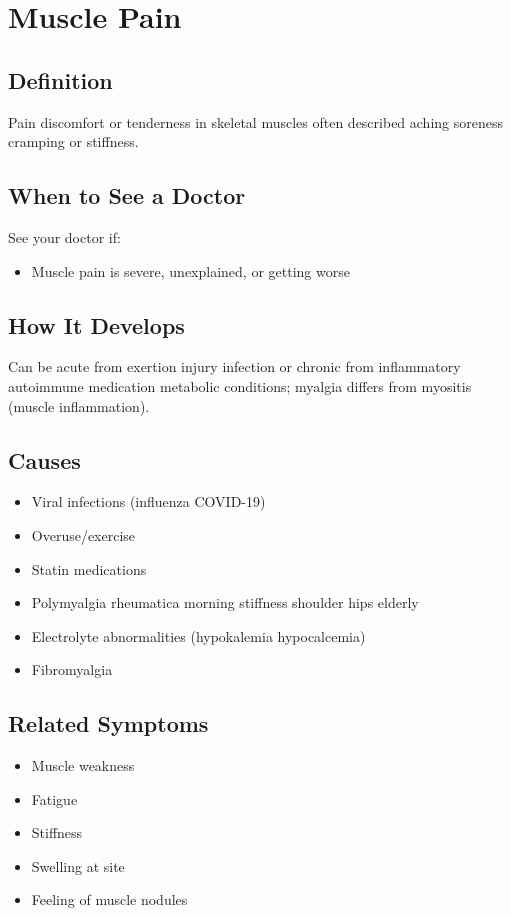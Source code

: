 \chapter{Muscle Pain}

\section*{Definition}
Pain discomfort or tenderness in skeletal muscles often described aching soreness cramping or stiffness.

\section*{When to See a Doctor}
See your doctor if:
\begin{itemize}
  \item Muscle pain is severe, unexplained, or getting worse
\end{itemize}

\section*{How It Develops}
Can be acute from exertion injury infection or chronic from inflammatory autoimmune medication metabolic conditions; myalgia differs from myositis (muscle inflammation).

\section*{Causes}
\begin{itemize}
  \item Viral infections (influenza COVID-19)
  \item Overuse/exercise
  \item Statin medications
  \item Polymyalgia rheumatica morning stiffness shoulder hips elderly
  \item Electrolyte abnormalities (hypokalemia hypocalcemia)
  \item Fibromyalgia
\end{itemize}

\section*{Related Symptoms}
\begin{itemize}
  \item Muscle weakness
  \item Fatigue
  \item Stiffness
  \item Swelling at site
  \item Feeling of muscle nodules
\end{itemize}


